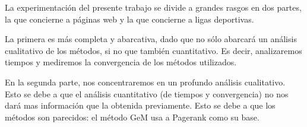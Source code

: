 La experimentación del presente trabajo se divide a grandes rasgos en dos partes, la que concierne a páginas web y la que concierne a ligas deportivas.

La primera es más completa y abarcativa, dado que no sólo abarcará un análisis cualitativo de los m\'etodos, si no que tambi\'en cuantitativo. Es decir, analizaremos tiempos y mediremos la convergencia de los m\'etodos utilizados.

En la segunda parte, nos concentraremos en un profundo análisis cualitativo. Esto se debe a que el análisis cuantitativo (de tiempos y convergencia) no nos dará mas información que la obtenida previamente. Esto se debe a que los m\'etodos son parecidos: el m\'etodo GeM usa a Pagerank como su base.

